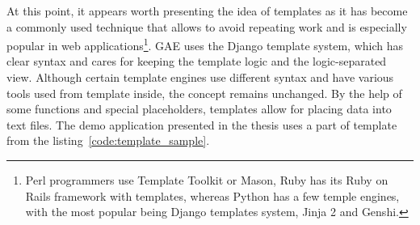 At this point, it appears worth presenting the idea of templates as it has become a commonly used technique that allows to avoid repeating work and is especially popular in web applications\footnote{Perl programmers use Template Toolkit or Mason, Ruby has its Ruby on Rails framework with templates, whereas Python has a few temple engines, with the most popular being Django templates system, Jinja 2 and Genshi.}. GAE uses the Django template system, which has clear syntax and cares for keeping the template logic and the logic-separated view. Although certain template engines use different syntax and have various tools used from template inside, the concept remains unchanged. By the help of some functions and special placeholders, templates allow for placing data into text files. The demo application presented in the thesis uses a part of template from the listing~\ref{code:template_sample}. 


